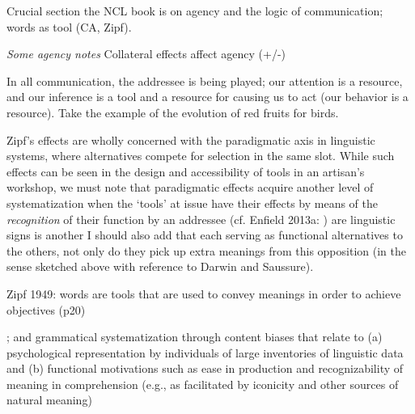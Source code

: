Crucial section the NCL book is on agency and the logic of communication; words as tool (CA, Zipf).

\textit{Some agency notes}
Collateral effects affect agency (+/-)

In all communication, the addressee is being played; our attention is a resource, and our inference is a tool and a resource for causing us to act (our behavior is a resource). Take the example of the evolution of red fruits for birds.



Zipf's effects are wholly concerned with the paradigmatic axis in linguistic systems, where alternatives compete for selection in the same slot. While such effects can be seen in the design and accessibility of tools in an artisan's workshop, we must note that paradigmatic effects acquire another level of systematization when the \textquoteleft tools' at issue have their effects by means of the \textit{recognition }of their function by an addressee (cf. Enfield 2013a: ) are linguistic signs is another I should also add that each serving as functional alternatives to the others, not only do they pick up extra meanings from this opposition (in the sense sketched above with reference to Darwin and Saussure).

Zipf 1949: words are tools that are used to convey meanings in order to achieve objectives (p20)

; and grammatical systematization through content biases that relate to (a) psychological representation by individuals of large inventories of linguistic data and (b) functional motivations such as ease in production and recognizability of meaning in comprehension (e.g., as facilitated by iconicity and other sources of natural meaning)


